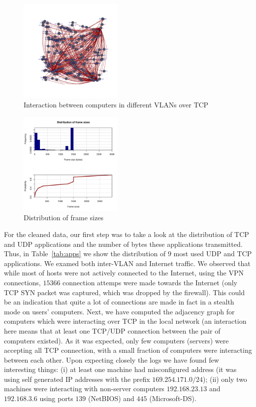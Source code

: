\begin{figure}[!hbt]\centering
  \includegraphics[width=0.45\textwidth]{graphics/interaction_between_local_computers_over_tcp.pdf}
  \caption{Interaction between computers in different VLANs over TCP}
  \label{fig:interaction}
\end{figure}

\begin{figure}[!hbt]\centering
  \includegraphics[width=0.45\textwidth]{graphics/distribution_of_frame_sizes.pdf}
  \caption{Distribution of frame sizes}
  \label{fig:frame_sizes}
\end{figure}


For the cleaned data, our first step was to take a look at the distribution of TCP and UDP applications and the number of bytes these 
applications transmitted. Thus, in Table~\ref{tab:apps} we show the distribution of $9$ most used UDP and TCP applications. We examed 
both inter-VLAN and Internet traffic. We observed that while most of hosts were not actively connected to the Internet, using the VPN 
connections, $15366$ connection attemps were made towards the Internet (only TCP SYN packet was captured, which was dropped by the 
firewall). This could be an indication that quite a lot of connections are made in fact in a stealth mode on users' computers. Next, we 
have computed the adjacency graph for computers which were interacting over TCP in the local network (an interaction here means that at 
least one TCP/UDP connection between the pair of computers existed).  As it was expected, only few computers (servers) were accepting all TCP connection, with a small 
fraction of computers were interacting between each other. Upon expecting closely the logs we have found few interesting things: (i) at 
least one machine had misconfigured address (it was using self generated IP addresses with the prefix $169.254.171.0/24$); (ii) 
only two machines were interacting with non-server computers $192.168.23.13$ and $192.168.3.6$ using ports $139$ (NetBIOS) and $445$ 
(Microsoft-DS).

